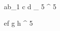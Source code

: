 \begin{eqcode}{a}{b}{_1}{}
  c \gets d _ 5 ^ 5 \lend
\end{eqcode}


\begin{eqcode}{e}{f}{}{}
  g \gets h ^ 5 \lend
\end{eqcode}
